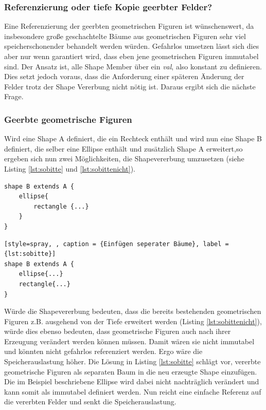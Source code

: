 \subsubsection{Referenzierung oder tiefe Kopie geerbter Felder?}\label{referenceorclone}
Eine Referenzierung der geerbten geometrischen Figuren ist \linebreak wünschenswert, da insbesondere große geschachtelte Bäume aus geometrischen Figuren sehr viel speicherschonender behandelt werden würden. Gefahrlos umsetzen lässt sich dies aber nur wenn garantiert wird, dass eben jene geometrischen Figuren immutabel sind.
Der Ansatz ist, alle Shape Member über ein \textit{val}, also konstant zu definieren. Dies setzt jedoch voraus, dass die Anforderung einer späteren Änderung der Felder trotz der Shape Vererbung nicht nötig ist. Daraus ergibt sich die nächste Frage.
\subsubsection{Geerbte geometrische Figuren}
Wird eine Shape A definiert, die ein Rechteck enthält
und wird nun eine Shape B definiert, die selber eine Ellipse enthält und zusätzlich Shape A erweitert,so ergeben sich nun zwei Möglichkeiten, die Shapevererbung umzusetzen (siehe Listing \ref{lst:sobitte} und \ref{lst:sobittenicht}).

\begin{lstlisting}[style=spray, caption = {Erweiterung der geometrischen Figuren anhand z.B. der Tiefe der Elemente}, label = {lst:sobittenicht}]
shape B extends A {
    ellipse{
        rectangle {...}
    }
}
\end{lstlisting}
\begin{lstlisting}[style=spray, , caption = {Einfügen seperater Bäume}, label = {lst:sobitte}]
shape B extends A {
    ellipse{...}
    rectangle{...}
}
\end{lstlisting}Würde die Shapevererbung bedeuten, dass die bereits bestehenden geometrischen Figuren z.B. ausgehend von der Tiefe erweitert werden (Listing \ref{lst:sobittenicht}), würde dies ebenso bedeuten, dass geometrische Figuren auch nach ihrer Erzeugung verändert werden können müssen. Damit wären sie nicht immutabel und könnten nicht gefahrlos referenziert werden. Ergo wäre die Speicherauslastung höher. Die Lösung in Listing \ref{lst:sobitte} schlägt vor, vererbte geometrische Figuren als separaten Baum in die neu erzeugte Shape einzufügen. Die im Beispiel beschriebene Ellipse wird dabei nicht nachträglich verändert und kann somit als immutabel definiert werden. Nun reicht eine einfache Referenz auf die vererbten Felder und senkt die Speicherauslastung.
